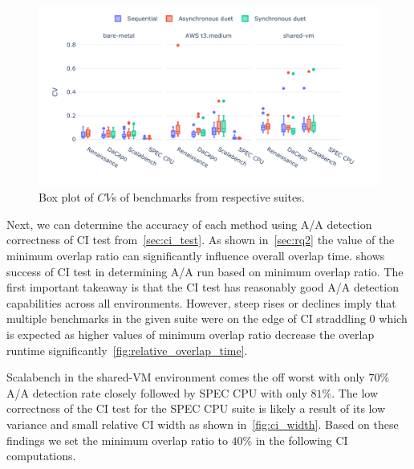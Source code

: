 \begin{figure}
	\centering
	\includegraphics[width=1\linewidth]{./figures/cv.pdf}
	\caption{
		Box plot of $CV$s of benchmarks from respective suites.
	}
	\label{fig:cv}
\end{figure}

Next, we can determine the accuracy of each method using A/A detection correctness of CI test from~\cref{sec:ci_test}.
As shown in~\cref{sec:rq2} the value of the minimum overlap ratio can significantly influence overall overlap time.
 shows success of CI test in determining A/A run based on minimum overlap ratio.
The first important takeaway is that the CI test has reasonably good A/A detection capabilities across all environments.
However, steep rises or declines imply that multiple benchmarks in the given suite were on the edge of CI straddling $0$ which is expected as higher values of minimum overlap ratio decrease the overlap runtime significantly~\ref{fig:relative_overlap_time}.

Scalabench in the \mbox{shared-VM} environment comes the off worst with only $70\%$ A/A detection rate closely followed by SPEC CPU with only $81\%$.
The low correctness of the CI test for the SPEC CPU suite is likely a result of its low variance and small relative CI width as shown in~\cref{fig:ci_width}.
Based on these findings we set the minimum overlap ratio to $40\%$ in the following CI computations.

